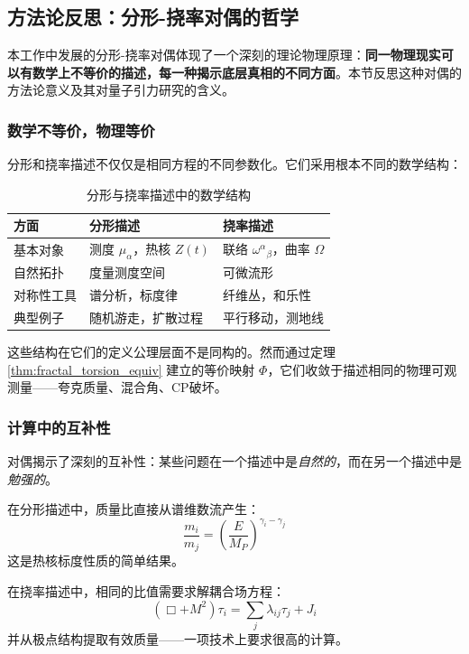 \subsection{方法论反思：分形-挠率对偶的哲学}
\label{sec:methodology}

本工作中发展的分形-挠率对偶体现了一个深刻的理论物理原理：\textbf{同一物理现实可以有数学上不等价的描述，每一种揭示底层真相的不同方面}。本节反思这种对偶的方法论意义及其对量子引力研究的含义。

\subsubsection{数学不等价，物理等价}

分形和挠率描述不仅仅是相同方程的不同参数化。它们采用根本不同的数学结构：

\begin{table}[h]
\centering
\begin{tabular}{p{3cm}p{4cm}p{4cm}}
\hline
\textbf{方面} & \textbf{分形描述} & \textbf{挠率描述} \\
\hline
基本对象 & 测度 $\mu_\alpha$，热核 $Z(t)$ & 联络 $\omega^\alpha{}_\beta$，曲率 $\Omega$ \\
自然拓扑 & 度量测度空间 & 可微流形 \\
对称性工具 & 谱分析，标度律 & 纤维丛，和乐性 \\
典型例子 & 随机游走，扩散过程 & 平行移动，测地线 \\
\hline
\end{tabular}
\caption{分形与挠率描述中的数学结构}
\end{table}

这些结构在它们的定义公理层面不是同构的。然而通过定理 \ref{thm:fractal_torsion_equiv} 建立的等价映射 $\Phi$，它们收敛于描述相同的物理可观测量——夸克质量、混合角、CP破坏。

\subsubsection{计算中的互补性}

对偶揭示了深刻的互补性：某些问题在一个描述中是\textit{自然的}，而在另一个描述中是\textit{勉强的}。

\begin{example}[质量层次]
在分形描述中，质量比直接从谱维数流产生：
\begin{equation}
    \frac{m_i}{m_j} = \left(\frac{E}{M_P}\right)^{\gamma_i - \gamma_j}
\end{equation}
这是热核标度性质的简单结果。

在挠率描述中，相同的比值需要求解耦合场方程：
\begin{equation}
    (\Box + M^2) \tau_i = \sum_j \lambda_{ij} \tau_j + J_i
\end{equation}
并从极点结构提取有效质量——一项技术上要求很高的计算。
\end{example}

